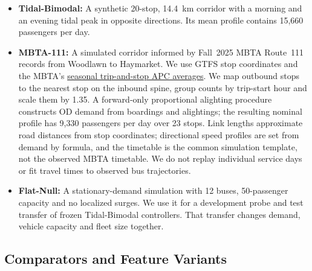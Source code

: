 \begin{itemize}
  \item \textbf{Tidal-Bimodal:} A synthetic 20-stop, 14.4~km corridor with a morning and an evening tidal peak in opposite directions. Its mean profile contains 15,660 passengers per day.
  \item \textbf{MBTA-111:} A simulated corridor informed by Fall~2025 MBTA Route~111 records from Woodlawn to Haymarket. We use GTFS stop coordinates and the MBTA's \href{https://www.arcgis.com/sharing/rest/content/items/8daf4a33925a4df59183f860826d29ee/info/metadata/metadata.xml?format=default\&output=html}{seasonal trip-and-stop APC averages}. We map outbound stops to the nearest stop on the inbound spine, group counts by trip-start hour and scale them by 1.35. A forward-only proportional alighting procedure constructs OD demand from boardings and alightings; the resulting nominal profile has 9,330 passengers per day over 23 stops. Link lengths approximate road distances from stop coordinates; directional speed profiles are set from demand by formula, and the timetable is the common simulation template, not the observed MBTA timetable. We do not replay individual service days or fit travel times to observed bus trajectories.
  \item \textbf{Flat-Null:} A stationary-demand simulation with 12 buses, 50-passenger capacity and no localized surges. We use it for a development probe and test transfer of frozen Tidal-Bimodal controllers. That transfer changes demand, vehicle capacity and fleet size together.
\end{itemize}

\subsection{Comparators and Feature Variants}
\label{sec:setup_baselines}

